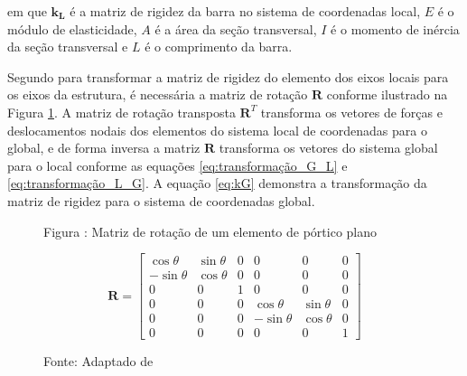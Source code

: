 em que $\mathbf{k_{L}}$ é a matriz de rigidez da barra no sistema de coordenadas local, $E$ é o módulo de elasticidade, $A$ é a área da seção transversal, $I$ é o momento de inércia da seção transversal e $L$ é o comprimento da barra.

Segundo  para transformar a matriz de rigidez do elemento dos eixos locais para os eixos da estrutura, é necessária a matriz de rotação $\mathbf{R}$ conforme ilustrado na Figura \ref{Fig.4.5}. A matriz de rotação transposta $\mathbf{R}^T$ transforma os vetores de forças e deslocamentos nodais dos elementos do sistema local de coordenadas para o global, e de forma inversa a matriz $\mathbf{R}$ transforma os vetores do sistema global para o local conforme as equações \ref{eq:transformação_G_L} e \ref{eq:transformação_L_G}. A equação \ref{eq:kG} demonstra a transformação da matriz de rigidez para o sistema de coordenadas global.

\begin{figure}[H]
    \centering
    \label{Fig.4.5}

    \begin{minipage}{10cm}
        \fontsize{10pt}{12pt}\selectfont
        Figura \thefigure: Matriz de rotação de um elemento de pórtico plano
    \end{minipage}

    \vspace{0.05cm}

    \[
        \mathbf{R} = \begin{bmatrix}
            \cos\theta & \sin\theta & 0 & 0 & 0 & 0 \\
            -\sin\theta & \cos\theta & 0 & 0 & 0 & 0 \\
            0 & 0 & 1 & 0 & 0 & 0 \\
            0 & 0 & 0 & \cos\theta & \sin\theta & 0 \\
            0 & 0 & 0 & -\sin\theta & \cos\theta & 0 \\
            0 & 0 & 0 & 0 & 0 & 1
        \end{bmatrix}
    \]

    \vspace{0.3cm}

    \begin{minipage}{10cm}
        \fontsize{10pt}{12pt}\selectfont
        Fonte: Adaptado de 
    \end{minipage}
\end{figure}

